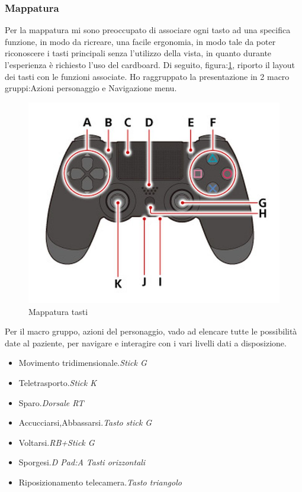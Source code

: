 \documentclass[
a4paper,
cleardoublepage=empty,
headings=twolinechapter,
numbers=autoenddot,
]{scrbook}
\begin{document}
     \subsubsection{Mappatura}
     Per la mappatura mi sono preoccupato di associare ogni tasto ad una specifica funzione, in modo da ricreare, una facile ergonomia, in modo tale da poter riconoscere i tasti principali senza l'utilizzo della vista, in quanto durante l'esperienza è richiesto l'uso del cardboard.
     Di seguito, figura:\ref{fig:gamepad_tasti}, riporto il layout dei tasti con le funzioni associate.
     Ho raggruppato la presentazione in 2 macro gruppi:Azioni personaggio e Navigazione menu.
     \begin{figure}[h]
     	\centering
     	\includegraphics[width=0.8\linewidth]{image/gamepad_tasti}
     	\caption{Mappatura tasti}
     	\label{fig:gamepad_tasti}
     \end{figure}
      Per il macro gruppo, azioni del personaggio, vado ad elencare tutte le possibilità date al paziente, per navigare e interagire con i vari livelli dati a disposizione.
     \begin{itemize}
     	\item Movimento tridimensionale.\textit{Stick G}
     	\item Teletrasporto.\textit{Stick K}
     	\item Sparo.\textit{Dorsale RT}
     	\item Accucciarsi,Abbassarsi.\textit{Tasto stick G}
     	\item Voltarsi.\textit{RB+Stick G}
     	\item Sporgesi.\textit{D Pad:A Tasti orizzontali}
     	\item Riposizionamento telecamera.\textit{Tasto triangolo}
     \end{itemize}
\end{document}

